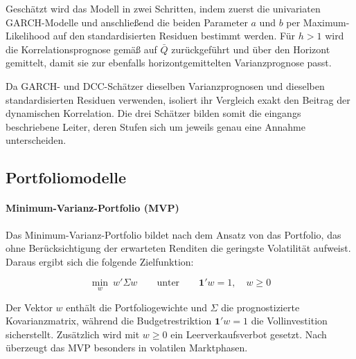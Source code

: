\documentclass[12pt,a4paper]{article}
\begin{document}
Geschätzt wird das Modell in zwei Schritten, indem zuerst die univariaten GARCH-Modelle und anschließend die beiden Parameter $a$ und $b$ per Maximum-Likelihood auf den standardisierten Residuen bestimmt werden.
Für $h > 1$ wird die Korrelationsprognose gemäß \textcite{engle2001} auf $\bar{Q}$ zurückgeführt und über den Horizont gemittelt, damit sie zur ebenfalls horizontgemittelten Varianzprognose passt.

Da GARCH- und DCC-Schätzer dieselben Varianzprognosen und dieselben standardisierten Residuen verwenden, isoliert ihr Vergleich exakt den Beitrag der dynamischen Korrelation.
Die drei Schätzer bilden somit die eingangs beschriebene Leiter, deren Stufen sich um jeweils genau eine Annahme unterscheiden.
\fi

\subsection{Portfoliomodelle}\label{subsec:portfolios}

\paragraph{Minimum-Varianz-Portfolio (MVP)}
\iffalse
Das Minimum-Varianz-Portfolio bildet nach dem Ansatz von \textcite{markowitz1952} das Portfolio, das ohne Berücksichtigung der erwarteten Renditen die geringste Volatilität aufweist.
Daraus ergibt sich die folgende Zielfunktion:

\begin{equation}
	\min_{w}\ w'\Sigma w \qquad \text{unter} \qquad \mathbf{1}'w = 1, \quad w \geq 0
	\label{eq:mvp}
\end{equation}

Der Vektor $w$ enthält die Portfoliogewichte und $\Sigma$ die prognostizierte Kovarianzmatrix, während die Budgetrestriktion $\mathbf{1}'w = 1$ die Vollinvestition sicherstellt.
Zusätzlich wird mit $w \geq 0$ ein Leerverkaufsverbot gesetzt.
Nach \textcite{behr2008} überzeugt das MVP besonders in volatilen Marktphasen.
\end{document}
